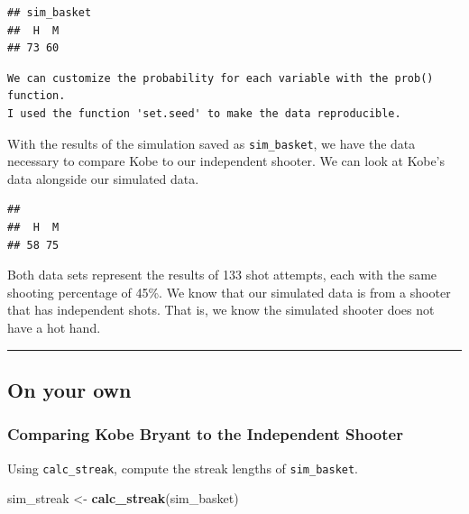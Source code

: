 \documentclass[]{article}
\newenvironment{Shaded}{\begin{snugshade}}{\end{snugshade}}
\newcommand{\KeywordTok}[1]{\textcolor[rgb]{0.13,0.29,0.53}{\textbf{{#1}}}}
\newcommand{\StringTok}[1]{\textcolor[rgb]{0.31,0.60,0.02}{{#1}}}
\newcommand{\NormalTok}[1]{{#1}}
\begin{document}
\begin{verbatim}
## sim_basket
##  H  M 
## 73 60
\end{verbatim}

\begin{verbatim}
We can customize the probability for each variable with the prob() function.
I used the function 'set.seed' to make the data reproducible.
\end{verbatim}

With the results of the simulation saved as \texttt{sim\_basket}, we
have the data necessary to compare Kobe to our independent shooter. We
can look at Kobe's data alongside our simulated data.

\begin{Shaded}
\end{Shaded}

\begin{verbatim}
## 
##  H  M 
## 58 75
\end{verbatim}

Both data sets represent the results of 133 shot attempts, each with the
same shooting percentage of 45\%. We know that our simulated data is
from a shooter that has independent shots. That is, we know the
simulated shooter does not have a hot hand.

\begin{center}\rule{0.5\linewidth}{\linethickness}\end{center}

\subsection{On your own}\label{on-your-own}

\subsubsection{Comparing Kobe Bryant to the Independent
Shooter}\label{comparing-kobe-bryant-to-the-independent-shooter}

Using \texttt{calc\_streak}, compute the streak lengths of
\texttt{sim\_basket}.

\begin{Shaded}
\begin{Highlighting}[]
\NormalTok{sim_streak <-}\StringTok{ }\KeywordTok{calc_streak}\NormalTok{(sim_basket)}
\end{Highlighting}
\end{Shaded}
\end{document}
